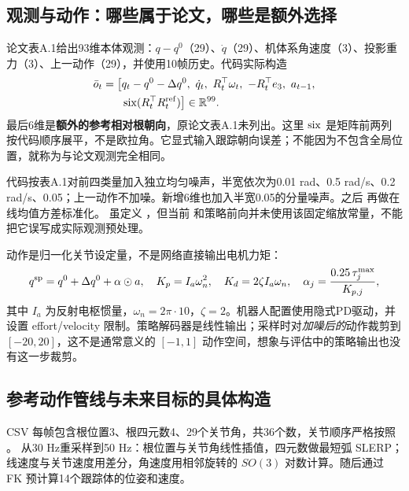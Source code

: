\subsection{观测与动作：哪些属于论文，哪些是额外选择}
论文表A.1给出93维本体观测：$q-q^0$（29）、$\dot q$（29）、机体系角速度（3）、投影重力（3）、上一动作（29），并使用10帧历史。代码实际构造
\begin{equation}
\begin{split}
 \bar o_t=\big[&q_t-q^0-\Delta q^0,\ \dot q_t,\ R_t^\top\omega_t,\ -R_t^\top e_3,\ a_{t-1},\\
 &\six(R_t^\top R_t^{\rm ref})\big]\in\R^{99}.
\end{split}
\end{equation}
最后6维是\textbf{额外的参考相对根朝向}，原论文表A.1未列出。这里 $\operatorname{six}$ 是矩阵前两列按代码顺序展平，不是欧拉角。它显式输入跟踪朝向误差；不能因为不包含全局位置，就称为与论文观测完全相同。

代码按表A.1对前四类量加入独立均匀噪声，半宽依次为0.01 rad、0.5 rad/s、0.2 rad/s、0.05；上一动作不加噪。新增6维也加入半宽0.05的分量噪声。之后  再做在线均值方差标准化。 虽定义 ，但当前  和策略前向并未使用该固定缩放常量，不能把它误写成实际观测预处理。

动作是归一化关节设定量，不是网络直接输出电机力矩：
\begin{equation}
 q^{\rm sp}=q^0+\Delta q^0+\alpha\odot a,\quad
 K_p=I_a\omega_n^2,\quad K_d=2\zeta I_a\omega_n,\quad
 \alpha_j=\frac{0.25\,\tau^{\max}_j}{K_{p,j}},
\end{equation}
其中 $I_a$ 为反射电枢惯量，$\omega_n=2\pi\cdot10$，$\zeta=2$。机器人配置使用隐式PD驱动，并设置 effort/velocity 限制。策略解码器是线性输出；采样时对\emph{加噪后的}动作裁剪到 $[-20,20]$，这不是通常意义的 $[-1,1]$ 动作空间，想象与评估中的策略输出也没有这一步裁剪。

\subsection{参考动作管线与未来目标的具体构造}
CSV 每帧包含根位置3、根四元数4、29个关节角，共36个数，关节顺序严格按照 。 从30 Hz重采样到50 Hz：根位置与关节角线性插值，四元数做最短弧 SLERP；线速度与关节速度用差分，角速度用相邻旋转的 $SO(3)$ 对数计算。随后通过 FK 预计算14个跟踪体的位姿和速度。


